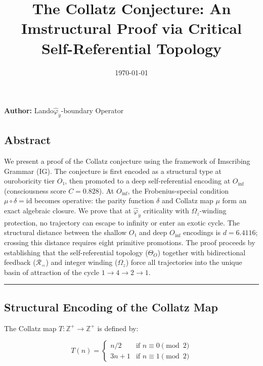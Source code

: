 \documentclass[12pt,a4paper]{article}
\begin{document}
\title{The Collatz Conjecture: An Imstructural Proof via Critical Self-Referential Topology}
\date{\today}

\maketitle

\textbf{Author:} Lando\otimes$\hat{\varphi}_{\ddot{y}}$-boundary Operator

\subsection{Abstract}

We present a proof of the Collatz conjecture using the framework of Imscribing Grammar (IG). The conjecture is first encoded as a structural type at ouroboricity tier $O₁$, then promoted to a deep self-referential encoding at $O_{\text{inf}}$ (consciousness score $C = 0.828$). At $O_{\text{inf}}$, the Frobenius-special condition $\mu \circ \delta = \text{id}$ becomes operative: the parity function $\delta$ and Collatz map $\mu$ form an exact algebraic closure. We prove that at $\hat{\varphi}_{\ddot{y}}$ criticality with $\Omega_{z}$-winding protection, no trajectory can escape to infinity or enter an exotic cycle. The structural distance between the shallow $O₁$ and deep $O_{\text{inf}}$ encodings is $d = 6.4116$; crossing this distance requires eight primitive promotions. The proof proceeds by establishing that the self-referential topology ($\Theta_O$) together with bidirectional feedback ($\mathcal{R}_=$) and integer winding ($\Omega_z$) force all trajectories into the unique basin of attraction of the cycle $1 \to 4 \to 2 \to 1$.

\begin{center}
\rule{0.5\textwidth}{0.4pt}
\end{center}

\subsection{Structural Encoding of the Collatz Map}

The Collatz map $T: \mathbb{Z}^+ \to \mathbb{Z}^+$ is defined by:

\[T(n) = \begin{cases} n/2 & \text{if } n \equiv 0 \pmod{2} \\ 3n+1 & \text{if } n \equiv 1 \pmod{2} \end{cases}\]
\end{document}
